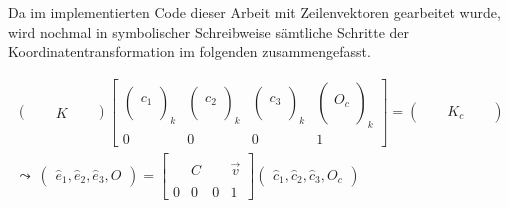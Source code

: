 Da im implementierten Code dieser Arbeit mit Zeilenvektoren gearbeitet wurde, wird nochmal in symbolischer Schreibweise sämtliche Schritte der Koordinatentransformation im folgenden zusammengefasst. 

\begin{gather}
\begin{pmatrix}
&&K&&
\end{pmatrix}
\begin{bmatrix}
\begin{pmatrix}\\c_1\\\\ \end{pmatrix}_k & \begin{pmatrix}\\c_2\\\\ \end{pmatrix}_k & \begin{pmatrix}\\c_3\\\\ \end{pmatrix}_k & \begin{pmatrix}\\O_c\\\\ \end{pmatrix}_k\\
0&0&0&1
\end{bmatrix} = \begin{pmatrix}
&&K_c&&
\end{pmatrix}\\
\leadsto \: 
\begin{pmatrix}
\hat{e}_1,\hat{e}_2,\hat{e}_3,O
\end{pmatrix} = 
\begin{bmatrix}
&  &  & \\
&  C&  &\vec{v} \\ 
&  &  & \\
0&0&0 & 1
\end{bmatrix}
\begin{pmatrix}
\hat{c}_1,\hat{c}_2,\hat{c}_3,O_c
\end{pmatrix}
\end{gather}


